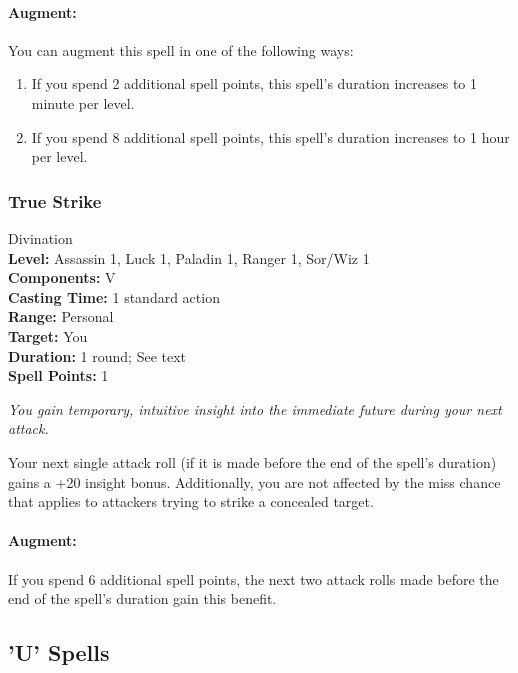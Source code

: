 \paragraph{Augment:} You can augment this spell in one of the following ways:
\begin{enumerate}
 \item If you spend 2 additional spell points, this spell's duration increases to 1 minute per level.
 \item If you spend 8 additional spell points, this spell's duration increases to 1 hour per level.
\end{enumerate}
\subsubsection{True Strike}
\label{Spell:TrueStrike}
Divination
\\ \textbf{Level:} Assassin 1, Luck 1, Paladin 1, Ranger 1, Sor/Wiz 1
\\ \textbf{Components:} V
\\ \textbf{Casting Time:} 1 standard action
\\ \textbf{Range:} Personal
\\ \textbf{Target:} You
\\ \textbf{Duration:} 1 round; See text
\\ \textbf{Spell Points:} 1

\emph{You gain temporary, intuitive insight into the immediate future during your next attack.}

Your next single attack roll (if it is made before the end of the spell's duration) gains a +20 insight bonus. 
Additionally, you are not affected by the miss chance that applies to attackers trying to strike a concealed target.

\paragraph{Augment:} If you spend 6 additional spell points, the next two attack rolls made before the end of the spell's duration gain this benefit.

\subsection{'U' Spells}
